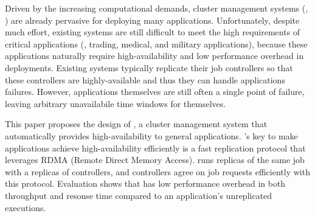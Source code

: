 
Driven by the increasing computational demands, cluster management systems 
(\eg, \mesos) are already pervasive for deploying many applications. 
Unfortunately, despite much effort, existing systems are still difficult to 
meet the high requirements of critical applications (\eg, trading, medical, and 
military applications), because these applications naturally require 
high-availability and low performance overhead in deployments. Existing systems 
typically replicate their job controllers so that these controllers are 
highly-available and thus they can handle applications failures. However, 
applications themselves are still often a single point of failure, leaving 
arbitrary unavailabile time windows for themselves.


This paper proposes the design of \xxx, a cluster management system that 
automatically provides high-availability to general applications. \xxx's key to 
make applications achieve high-availability efficiently is a fast \paxos 
replication protocol that leverages RDMA (Remote Direct Memory Access). \xxx 
runs replicas of the same job with a replicas of controllers, and 
controllers agree on job requests efficiently with this protocol.
Evaluation shows that \xxx has low performance overhead in 
both throughput and resonse time compared to an application's 
unreplicated executions.


